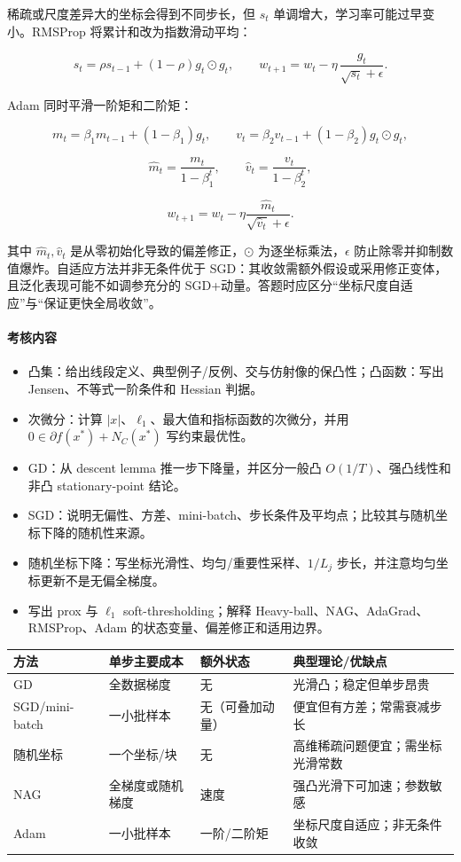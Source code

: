 稀疏或尺度差异大的坐标会得到不同步长，但 \(s_t\) 单调增大，学习率可能过早变小。RMSProp 将累计和改为指数滑动平均：

\[
  s_t=\rho s_{t-1}+(1-\rho)g_t\odot g_t,
  \qquad
  w_{t+1}=w_t-\eta\,\frac{g_t}{\sqrt{s_t}+\epsilon}.
\]

Adam 同时平滑一阶矩和二阶矩：

\[
  m_t=\beta_1m_{t-1}+(1-\beta_1)g_t,
  \qquad
  v_t=\beta_2v_{t-1}+(1-\beta_2)g_t\odot g_t,
\]

\[
  \widehat m_t=\frac{m_t}{1-\beta_1^t},
  \qquad
  \widehat v_t=\frac{v_t}{1-\beta_2^t},
\]

\[
  w_{t+1}
  =
  w_t
  -
  \eta
  \frac{\widehat m_t}{\sqrt{\widehat v_t}+\epsilon}.
\]

其中 \(\widehat m_t,\widehat v_t\) 是从零初始化导致的偏差修正，\(\odot\) 为逐坐标乘法，\(\epsilon\) 防止除零并抑制数值爆炸。自适应方法并非无条件优于 SGD：其收敛需额外假设或采用修正变体，且泛化表现可能不如调参充分的 SGD+动量。答题时应区分“坐标尺度自适应”与“保证更快全局收敛”。

\paragraph{考核内容}

\begin{itemize}
  \item 凸集：给出线段定义、典型例子/反例、交与仿射像的保凸性；凸函数：写出 Jensen、不等式一阶条件和 Hessian 判据。
  \item 次微分：计算 \(|x|\)、\(\ell_1\)、最大值和指标函数的次微分，并用 \(0\in\partial f(x^*)+N_C(x^*)\) 写约束最优性。
  \item GD：从 descent lemma 推一步下降量，并区分一般凸 \(O(1/T)\)、强凸线性和非凸 stationary-point 结论。
  \item SGD：说明无偏性、方差、mini-batch、步长条件及平均点；比较其与随机坐标下降的随机性来源。
  \item 随机坐标下降：写坐标光滑性、均匀/重要性采样、\(1/L_j\) 步长，并注意均匀坐标更新不是无偏全梯度。
  \item 写出 prox 与 \(\ell_1\) soft-thresholding；解释 Heavy-ball、NAG、AdaGrad、RMSProp、Adam 的状态变量、偏差修正和适用边界。
\end{itemize}

\begin{center}
\small
\begin{tabular}{p{2.4cm}p{2.7cm}p{2.6cm}p{3.4cm}}
\toprule
方法 & 单步主要成本 & 额外状态 & 典型理论/优缺点\\
\midrule
GD & 全数据梯度 & 无 & 光滑凸；稳定但单步昂贵\\
SGD/mini-batch & 一小批样本 & 无（可叠加动量） & 便宜但有方差；常需衰减步长\\
随机坐标 & 一个坐标/块 & 无 & 高维稀疏问题便宜；需坐标光滑常数\\
NAG & 全梯度或随机梯度 & 速度 & 强凸光滑下可加速；参数敏感\\
Adam & 一小批样本 & 一阶/二阶矩 & 坐标尺度自适应；非无条件收敛\\
\bottomrule
\end{tabular}
\end{center}

